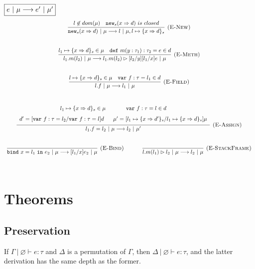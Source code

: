 \documentclass{llncs}
\newcommand{\keywadj}[1]{\mathtt{#1}}
\newcommand{\keyw}[1]{\keywadj{#1}~}
\begin{document}
$\fbox{$e~|~\mu \longrightarrow e'~|~\mu'$}$
\[
\begin{array}{c}
\infer[\textsc{(E-New)}]
  {\keywadj{new}_{s}(x \Rightarrow d)~|~\mu \longrightarrow l~|~\mu, l \mapsto \{ x \Rightarrow d \}_{s}}
  {l \not\in dom(\mu) & \keywadj{new}_{s}(x \Rightarrow d)~is~closed}\\[5ex]

\infer[\textsc{(E-Meth)}]
  {l_1.m(l_2)~|~\mu \longrightarrow l_1.m(l_2) \rhd [l_2/y][l_1/x]e~|~\mu}
  {l_1 \mapsto \{ x \Rightarrow d \}_{s} \in \mu & \keyw{def} m(y : \tau_1) : \tau_2 = e \in d}\\[5ex]

\infer[\textsc{(E-Field)}]
  {l.f~|~\mu \longrightarrow l_1~|~\mu}
  {l \mapsto \{ x \Rightarrow d \}_{s} \in \mu & \keyw{var} f:\tau = l_1 \in d}\\[5ex]

\infer[\textsc{(E-Assign)}]
  {l_1.f = l_2~|~\mu \longrightarrow l_2~|~\mu'}
  {\def\arraystretch{1.6}
  \begin{array}{c}
l_1 \mapsto \{ x \Rightarrow d \}_{s} \in \mu~~~~~~~~~~~\keyw{var} f:\tau = l \in d \\
d' = [\keyw{var} f:\tau = l_2/\keyw{var} f:\tau = l]d~~~~~\mu' = [l_1 \mapsto \{ x \Rightarrow d' \}_{s}/l_1 \mapsto \{ x \Rightarrow d \}_{s}]\mu
  \end{array}}\\[5ex]

\infer[\textsc{(E-Bind)}]
  {\keyw{bind} x = l_1~\keyw{in} e_2~|~\mu \longrightarrow [l_1/x]e_2~|~\mu}
  {}%
~~~~~~~~~~
\infer[\textsc{(E-StackFrame)}]
  {l.m(l_1) \rhd l_2~|~\mu \longrightarrow l_2~|~\mu}
  {}\\[5ex]
  
\end{array}
\]

\newpage

\section{Theorems}

\subsection{Preservation}

\begin{lemma}[Permutation]
If $\Gamma~|~\varnothing \vdash e : \tau$ and $\Delta$ is a permutation of $\Gamma$, then $\Delta~|~\varnothing \vdash e : \tau$, and the latter derivation has the same depth as the former.
\end{lemma}
\end{document}
